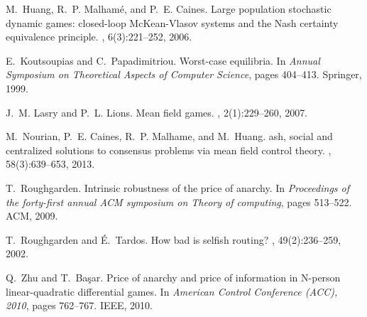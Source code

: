 \documentclass[11pt]{article}
\begin{document}
\begin{thebibliography}{10}
M.~Huang, R.~P. Malham{\'e}, and P.~E. Caines.
\newblock Large population stochastic dynamic games: closed-loop
  {M}c{K}ean-{V}lasov systems and the {N}ash certainty equivalence principle.
, 6(3):221--252, 2006.

E.~Koutsoupias and C.~Papadimitriou.
\newblock Worst-case equilibria.
\newblock In {\em Annual Symposium on Theoretical Aspects of Computer Science},
  pages 404--413. Springer, 1999.

J.~M. Lasry and P.~L. Lions.
\newblock Mean field games.
, 2(1):229--260, 2007.

M.~Nourian, P.~E. Caines, R.~P. Malhame, and M.~Huang.
ash, social and centralized solutions to consensus problems via
  mean field control theory.
, 58(3):639--653, 2013.

T.~Roughgarden.
\newblock Intrinsic robustness of the price of anarchy.
\newblock In {\em Proceedings of the forty-first annual ACM symposium on Theory
  of computing}, pages 513--522. ACM, 2009.

T.~Roughgarden and {\'E}.~Tardos.
\newblock How bad is selfish routing?
, 49(2):236--259, 2002.

Q.~Zhu and T.~Ba{\c{s}}ar.
\newblock Price of anarchy and price of information in {N}-person
  linear-quadratic differential games.
\newblock In {\em American Control Conference (ACC), 2010}, pages 762--767.
  IEEE, 2010.

\end{thebibliography}
\end{document}
